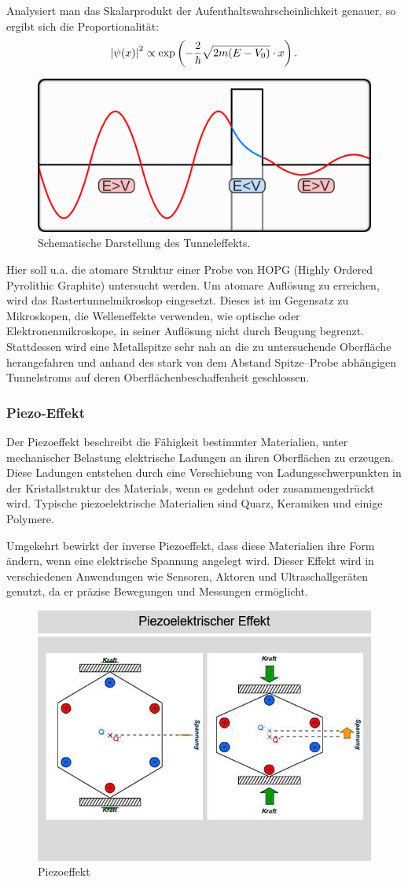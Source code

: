 \documentclass{article}
\begin{document}
Analysiert man das Skalarprodukt der Aufenthaltswahrscheinlichkeit genauer, so ergibt sich die Proportionalität:
\begin{align*}
    \abs{\psi(x)}^2 \propto \exp\left(-\frac{2}{\hbar} \sqrt{2m (E - V_0)} \cdot x\right).
\end{align*}

\begin{figure}[h!]
    \centering
    \includegraphics[width=0.5\linewidth]{figure/tunneleffekt.png}
    \caption{Schematische Darstellung des Tunneleffekts.}
    \label{fig:tunneleffekt}
\end{figure}

Hier soll u.a. die atomare Struktur einer Probe von HOPG (Highly Ordered Pyrolithic Graphite) untersucht werden. Um atomare Auflösung zu erreichen, wird das Rastertunnelmikroskop eingesetzt. Dieses ist im Gegensatz zu Mikroskopen, die Welleneffekte verwenden, wie optische oder Elektronenmikroskope,
in seiner Auflösung nicht durch Beugung begrenzt.
Stattdessen wird eine Metallspitze sehr nah an die zu untersuchende Oberfläche 
herangefahren und anhand des stark von dem Abstand Spitze--Probe abhängigen Tunnelstroms auf deren Oberflächenbeschaffenheit geschlossen.

\subsubsection*{Piezo-Effekt}
Der Piezoeffekt beschreibt die Fähigkeit bestimmter Materialien, unter mechanischer Belastung elektrische Ladungen an ihren Oberflächen zu erzeugen. Diese Ladungen entstehen durch eine Verschiebung von Ladungsschwerpunkten in der Kristallstruktur des Materials, wenn es gedehnt oder zusammengedrückt wird. Typische piezoelektrische Materialien sind Quarz, Keramiken und einige Polymere.

Umgekehrt bewirkt der inverse Piezoeffekt, dass diese Materialien ihre Form ändern, wenn eine elektrische Spannung angelegt wird. Dieser Effekt wird in verschiedenen Anwendungen wie Sensoren, Aktoren und Ultraschallgeräten genutzt, da er präzise Bewegungen und Messungen ermöglicht.

\begin{figure}[h!]
    \centering
    \includegraphics[width=0.5\linewidth]{figure/piezo_effekt.jpg}
    \caption{Piezoeffekt}
    \label{fig:piezoelektrische}
\end{figure}
\end{document}
